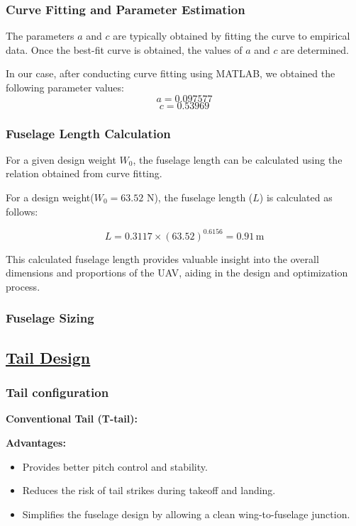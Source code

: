 \documentclass[12 pt]{article}
\begin{document}
{\subsubsection{Curve Fitting and Parameter Estimation}
\color{black}
The parameters \(a\) and \(c\) are typically obtained by fitting the curve to empirical data. Once the best-fit curve is obtained, the values of \(a\) and \(c\) are determined. 

In our case, after conducting curve fitting using MATLAB, we obtained the following parameter values:
\[ a = 0.097577 \]
\[ c = 0.53969 \] 
\subsubsection{{Fuselage Length Calculation}}
\color{black}
For a given design weight \(W_0\), the fuselage length can be calculated using the relation obtained from curve fitting. 

For a design weight(\(W_0 = 63.52\) N), the fuselage length (\(L\)) is calculated as follows:

\[
L = 0.3117 \times (63.52)^{0.6156} = 0.91 \, \text{m}
\]

This calculated fuselage length provides valuable insight into the overall dimensions and proportions of the UAV, aiding in the design and optimization process.

\subsubsection{Fuselage Sizing}
\color{black}
\vspace{10mm}
\subsection{\underline{Tail Design}}

\subsubsection{Tail configuration}

{\textbf{Conventional Tail (T-tail):}}

{\color{black}
\textbf{{Advantages:}}
\begin{itemize}
  \item Provides better pitch control and stability.
  \item Reduces the risk of tail strikes during takeoff and landing.
  \item Simplifies the fuselage design by allowing a clean wing-to-fuselage junction.
\end{itemize}

}}
\end{document}
